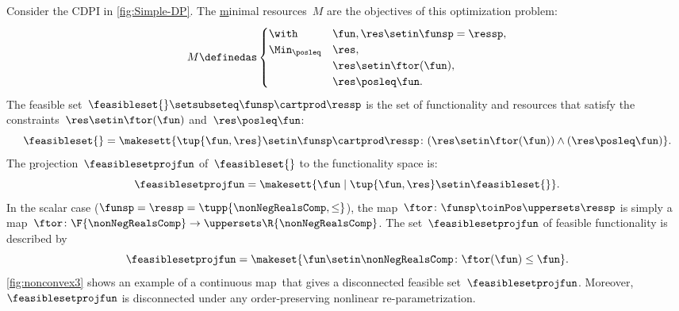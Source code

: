 \begin{example}
    \label{exa:one}
    Consider the CDPI in \cref{fig:Simple-DP}.
    The \uline{m}inimal resources~$M$ are the objectives of this optimization problem:
    \begin{equation}
        M\definedas
        \begin{cases}
            \with          & \fun,\res\setin\funsp=\ressp, \\
            \Min_{\posleq} & \res,                         \\
                           & \res\setin\ftor(\fun),        \\
                           & \res\posleq\fun.
        \end{cases}
    \end{equation}
    The feasible set~$\feasibleset{}\setsubseteq\funsp\cartprod\ressp$ is the set of functionality and resources that satisfy the constraints~$\res\setin\ftor(\fun)$ and~$\res\posleq\fun$:
    \begin{equation}
        \feasibleset{}=\makesett{ \tup{\fun,\res}\setin\funsp\cartprod\ressp\colon (\res\setin\ftor(\fun))\wedge(\res\posleq\fun)} .
        \label{eq:feasible}
    \end{equation}
    The \uline{p}rojection~$\feasiblesetprojfun$ of~$\feasibleset{}$ to the functionality space is:
    \begin{equation}
        \feasiblesetprojfun=\makesett{ \fun\mid\tup{\fun,\res} \setin\feasibleset{}}.
    \end{equation}
    In the scalar case ($\funsp=\ressp=\tupp{\nonNegRealsComp,\leq}$), the map~$\ftor\colon\funsp\toinPos\uppersets \ressp$ is simply a map~$\ftor\colon\F{\nonNegRealsComp}\to \uppersets\R{\nonNegRealsComp}$.
    The set~$\feasiblesetprojfun$ of feasible functionality is described by
    \begin{equation}
        \feasiblesetprojfun=\makeset{\fun\setin\nonNegRealsComp\colon \ftor(\fun)\leq\fun}.
        \label{eq:Pfeasible}
    \end{equation}
    \cref{fig:nonconvex3} shows an example of a continuous map~\ftor that gives a disconnected feasible set~$\feasiblesetprojfun$.
    Moreover,~$\feasiblesetprojfun$ is disconnected under any order-preserving nonlinear re-parametrization.

\end{example}


